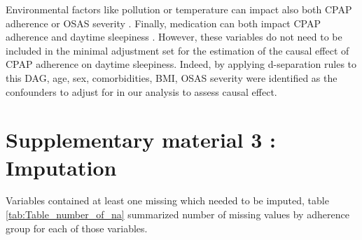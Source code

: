 \documentclass{article}
\begin{document}
Environmental factors like pollution or temperature can impact also both CPAP adherence or OSAS severity \cite{staatsImpactTemperatureObstructive2021,rapelliImprovingCPAPAdherence2021}. 
Finally, medication can both impact CPAP adherence and daytime sleepiness \cite{revolSevereExcessiveDaytime2017}. 
However, these variables do not need to be included in the minimal adjustment set for the estimation of the causal effect of CPAP adherence on daytime sleepiness.
Indeed, by applying d-separation rules to this DAG, age, sex, comorbidities, BMI, OSAS severity were identified as the confounders to adjust for in our analysis to assess causal effect.


\clearpage
\section*{Supplementary material 3 : Imputation}
Variables contained at least one missing which needed to be imputed, table \ref{tab:Table_number_of_na} summarized number of missing values by adherence group for each of those variables.
\end{document}
